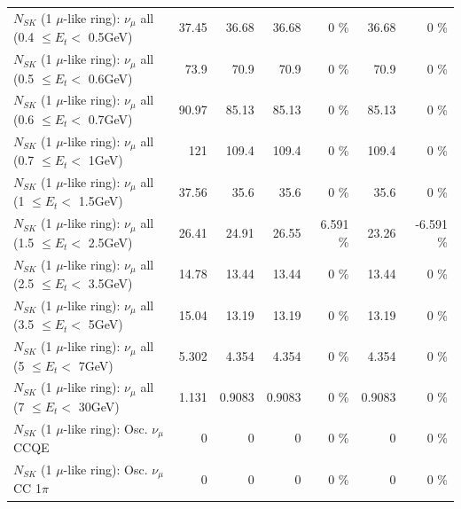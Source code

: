 \begin{table}
\begin{tabular}{| l | r | r | r  r | r  r |}
       $N_{SK}$ (1 $\mu$-like ring): $\nu_{\mu}$ all (0.4 $\leq E_{t} <$ 0.5GeV) &           37.45 &           36.68 &           36.68 &        0 \%  &           36.68 &        0 \%  \\ 
       $N_{SK}$ (1 $\mu$-like ring): $\nu_{\mu}$ all (0.5 $\leq E_{t} <$ 0.6GeV) &            73.9 &            70.9 &            70.9 &        0 \%  &            70.9 &        0 \%  \\ 
       $N_{SK}$ (1 $\mu$-like ring): $\nu_{\mu}$ all (0.6 $\leq E_{t} <$ 0.7GeV) &           90.97 &           85.13 &           85.13 &        0 \%  &           85.13 &        0 \%  \\ 
         $N_{SK}$ (1 $\mu$-like ring): $\nu_{\mu}$ all (0.7 $\leq E_{t} <$ 1GeV) &             121 &           109.4 &           109.4 &        0 \%  &           109.4 &        0 \%  \\ 
         $N_{SK}$ (1 $\mu$-like ring): $\nu_{\mu}$ all (1 $\leq E_{t} <$ 1.5GeV) &           37.56 &            35.6 &            35.6 &        0 \%  &            35.6 &        0 \%  \\ 
       $N_{SK}$ (1 $\mu$-like ring): $\nu_{\mu}$ all (1.5 $\leq E_{t} <$ 2.5GeV) &           26.41 &           24.91 &           26.55 &    6.591 \%  &           23.26 &   -6.591 \%  \\ 
       $N_{SK}$ (1 $\mu$-like ring): $\nu_{\mu}$ all (2.5 $\leq E_{t} <$ 3.5GeV) &           14.78 &           13.44 &           13.44 &        0 \%  &           13.44 &        0 \%  \\ 
         $N_{SK}$ (1 $\mu$-like ring): $\nu_{\mu}$ all (3.5 $\leq E_{t} <$ 5GeV) &           15.04 &           13.19 &           13.19 &        0 \%  &           13.19 &        0 \%  \\ 
           $N_{SK}$ (1 $\mu$-like ring): $\nu_{\mu}$ all (5 $\leq E_{t} <$ 7GeV) &           5.302 &           4.354 &           4.354 &        0 \%  &           4.354 &        0 \%  \\ 
          $N_{SK}$ (1 $\mu$-like ring): $\nu_{\mu}$ all (7 $\leq E_{t} <$ 30GeV) &           1.131 &          0.9083 &          0.9083 &        0 \%  &          0.9083 &        0 \%  \\ 
\hline
\hline
                               $N_{SK}$ (1 $\mu$-like ring): Osc. $\nu_\mu$ CCQE &               0 &               0 &               0 &        0 \%  &               0 &        0 \%  \\ 
                          $N_{SK}$ (1 $\mu$-like ring): Osc. $\nu_\mu$ CC 1$\pi$ &               0 &               0 &               0 &        0 \%  &               0 &        0 \%  \\ 

\end{tabular}
\end{table}
